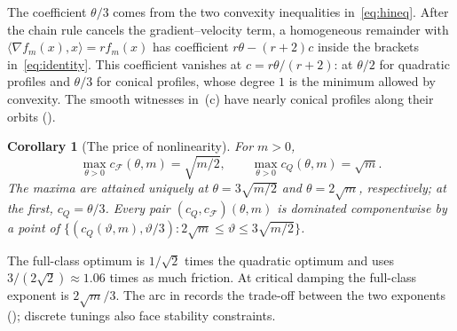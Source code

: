 \documentclass[11pt]{article}
\newtheorem{corollary}[theorem]{Corollary}
\theoremstyle{definition}
\theoremstyle{remark}
\newcommand{\cF}{\mathcal F}
\newcommand{\ip}[2]{\langle #1,#2\rangle}
\newcommand{\cQ}{c_{Q}}
\newcommand{\cFF}{c_{\cF}}
\begin{document}
The coefficient \(\theta/3\) comes from the two convexity inequalities
in~\eqref{eq:hineq}.  After the chain rule cancels the gradient--velocity
term, a homogeneous remainder with \(\ip{\nabla f_m(x)}x=r f_m(x)\)
has coefficient \(r\theta-(r+2)c\) inside the brackets in~\eqref{eq:identity}.
This coefficient vanishes at \(c=r\theta/(r+2)\): at \(\theta/2\) for
quadratic profiles and \(\theta/3\) for conical profiles, whose degree \(1\)
is the minimum allowed by convexity.  The smooth witnesses in~(c) have
nearly conical profiles along their orbits ().

\begin{corollary}[The price of nonlinearity]\label{cor:damping}
For \(m>0\),
\[
\max_{\theta>0}\cFF(\theta,m)=\sqrt{m/2},\qquad
\max_{\theta>0}\cQ(\theta,m)=\sqrt m.
\]
The maxima are attained uniquely at \(\theta=3\sqrt{m/2}\) and
\(\theta=2\sqrt m\), respectively; at the first, \(\cQ=\theta/3\).
Every pair \((\cQ,\cFF)(\theta,m)\) is dominated componentwise by a point of
\(\{(\cQ(\vartheta,m),\vartheta/3):2\sqrt m\le\vartheta\le3\sqrt{m/2}\}\).
\end{corollary}

The full-class optimum is \(1/\sqrt2\) times the quadratic optimum and
uses \(3/(2\sqrt2)\approx1.06\) times as much friction.
At critical damping the full-class exponent is \(2\sqrt m/3\).
The arc in  records the trade-off between the two
exponents (); discrete tunings also face stability constraints.
\end{document}
